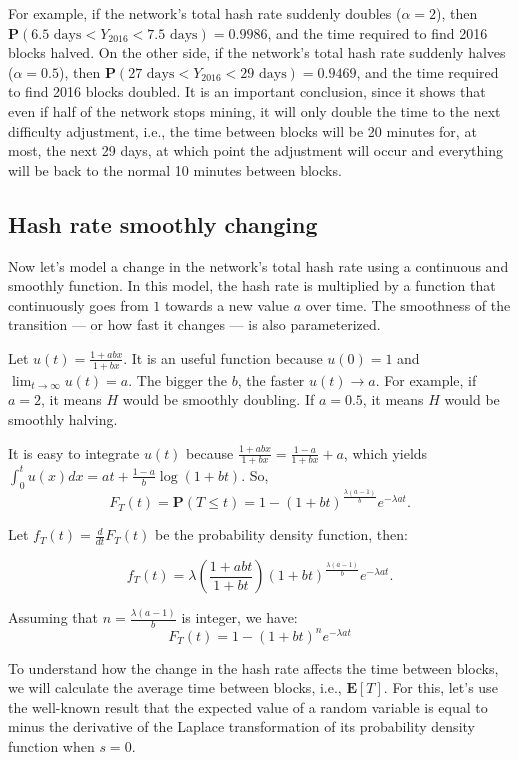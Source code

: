 For example, if the network's total hash rate suddenly doubles ($\alpha = 2$), then $\mathbf{P}(6.5 \text{ days} < Y_{2016} < 7.5 \text{ days}) = 0.9986$, and the time required to find 2016 blocks halved. On the other side, if the network's total hash rate suddenly halves ($\alpha = 0.5$), then $\mathbf{P}(27 \text{ days} < Y_{2016} < 29 \text{ days}) = 0.9469$, and the time required to find 2016 blocks doubled. It is an important conclusion, since it shows that even if half of the network stops mining, it will only double the time to the next difficulty adjustment, i.e., the time between blocks will be 20 minutes for, at most, the next 29 days, at which point the adjustment will occur and everything will be back to the normal 10 minutes between blocks.


\subsection{Hash rate smoothly changing}

Now let's model a change in the network's total hash rate using a continuous and smoothly function. In this model, the hash rate is multiplied by a function that continuously goes from $1$ towards a new value $a$ over time. The smoothness of the transition --- or how fast it changes --- is also parameterized.

Let $u(t) = \frac{1+abx}{1+bx}$. It is an useful function because $u(0) = 1$ and $\lim_{t \rightarrow \infty} u(t) = a$. The bigger the $b$, the faster $u(t) \rightarrow a$. For example, if $a=2$, it means $H$ would be smoothly doubling. If $a=0.5$, it means $H$ would be smoothly halving.

It is easy to integrate $u(t)$ because $\frac{1+abx}{1+bx} = \frac{1-a}{1+bx} + a$, which yields $\int_0^t u(x) dx = at + \frac{1-a}{b} \log(1+bt)$. So,
$$F_T(t) = \mathbf{P}(T \leq t) = 1 - (1+bt)^{\frac{\lambda(a-1)}{b}} e^{-\lambda at}.$$

Let $f_T(t) = \frac{d}{dt} F_T(t)$ be the probability density function, then:

$$f_T(t) = \lambda \left( \frac{1+abt}{1+bt} \right) (1+bt)^{\frac{\lambda(a-1)}{b}} e^{-\lambda at}.$$

Assuming that $n = \frac{\lambda(a-1)}{b}$ is integer, we have:
$$F_T(t) = 1 - (1+bt)^n e^{-\lambda at}$$

To understand how the change in the hash rate affects the time between blocks, we will calculate the average time between blocks, i.e., $\mathbf{E}[T]$. For this, let's use the well-known result that the expected value of a random variable is equal to minus the derivative of the Laplace transformation of its probability density function when $s=0$.

